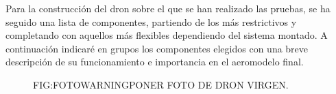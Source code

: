 
 Para la construcción del dron sobre el que se han realizado las pruebas, se ha seguido una lista de componentes, partiendo de los más restrictivos y completando con aquellos más flexibles dependiendo del sistema montado.
 A continuación indicaré en grupos los componentes elegidos con una breve descripción de su funcionamiento e importancia en el aeromodelo final.
 
  \begin{figure}[Dron básico]{FIG:FOTOWARNING}{PONER FOTO DE DRON VIRGEN.}
\end{figure}